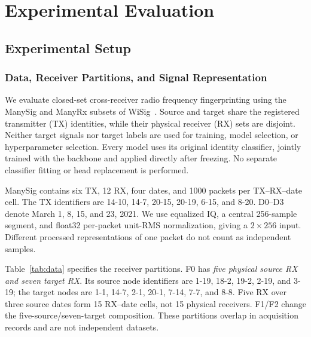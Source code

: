 \section{Experimental Evaluation}
\label{sec:experiments}

\subsection{Experimental Setup}
\subsubsection{Data, Receiver Partitions, and Signal Representation}
We evaluate closed-set cross-receiver radio frequency fingerprinting using the ManySig and ManyRx subsets of WiSig~\cite{wisig}. Source and target share the registered transmitter (TX) identities, while their physical receiver (RX) sets are disjoint. Neither target signals nor target labels are used for training, model selection, or hyperparameter selection. Every model uses its original identity classifier, jointly trained with the backbone and applied directly after freezing. No separate classifier fitting or head replacement is performed.

ManySig contains six TX, 12 RX, four dates, and 1000 packets per TX--RX--date cell. The TX identifiers are 14-10, 14-7, 20-15, 20-19, 6-15, and 8-20. D0--D3 denote March 1, 8, 15, and 23, 2021. We use equalized IQ, a central 256-sample segment, and float32 per-packet unit-RMS normalization, giving a $2\times256$ input. Different processed representations of one packet do not count as independent samples.

Table~\ref{tab:data} specifies the receiver partitions. F0 has \emph{five physical source RX and seven target RX}. Its source node identifiers are 1-19, 18-2, 19-2, 2-19, and 3-19; the target nodes are 1-1, 14-7, 2-1, 20-1, 7-14, 7-7, and 8-8. Five RX over three source dates form 15 RX--date cells, not 15 physical receivers. F1/F2 change the five-source/seven-target composition. These partitions overlap in acquisition records and are not independent datasets.

